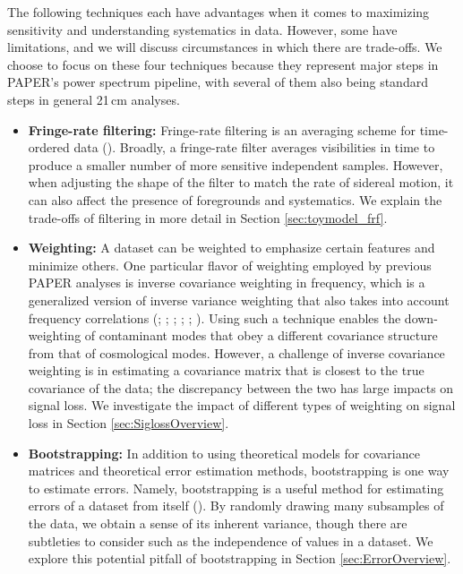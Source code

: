 \documentclass[preprint2,numberedappendix,tighten]{aastex6}  %
\begin{document}
The following techniques each have advantages when it comes to maximizing sensitivity and understanding systematics in 
data. However, some have limitations, and we will discuss circumstances in which there are trade-offs. We choose to focus on 
these four techniques because they represent major steps in PAPER's power spectrum pipeline, with several of them also 
being standard steps in general 21\,cm analyses.
\begin{itemize}
\item \textbf{Fringe-rate filtering:} Fringe-rate filtering is an averaging scheme for time-ordered data 
(\citealt{parsons_et_al2016}). Broadly, a fringe-rate filter averages visibilities in time to produce a smaller number of more sensitive 
independent samples. However, when adjusting the shape of the filter to match the rate of sidereal motion, it can also affect the presence 
of foregrounds and systematics. We explain the trade-offs of filtering in more detail in Section \ref{sec:toymodel_frf}.
\item \textbf{Weighting:} A dataset can be weighted to emphasize certain features and minimize others. One particular flavor of 
weighting employed by previous PAPER analyses is inverse covariance weighting in frequency, which is a generalized version of inverse variance 
weighting that also takes into account frequency correlations (\citealt{liu_tegmark2011}; \citealt{dillon_et_al2013a}; \citealt{liu_et_al2014a}; \citealt{liu_et_al2014b}; \citealt{dillon_et_al2014}; \citealt{dillon_et_al2015}). Using such a technique enables the down-weighting of contaminant modes that obey a different covariance structure from that of cosmological modes. However, a challenge of inverse covariance 
weighting is in estimating a covariance matrix that is closest to the true covariance of the data; the discrepancy between the two has large impacts on signal loss. We investigate the impact of different types of weighting on signal loss in Section \ref{sec:SiglossOverview}.
\item \textbf{Bootstrapping:} In addition to using theoretical models for covariance matrices and theoretical error estimation 
methods, bootstrapping is one way to estimate errors. Namely, bootstrapping is a useful method for estimating errors of a dataset from 
itself (\citealt{andrae2010}). By randomly drawing many subsamples of the data, we obtain a sense of its inherent variance, though there are subtleties to 
consider such as the independence of values in a dataset. We explore this potential pitfall of bootstrapping in Section \ref{sec:ErrorOverview}.

\end{itemize}
\end{document}
